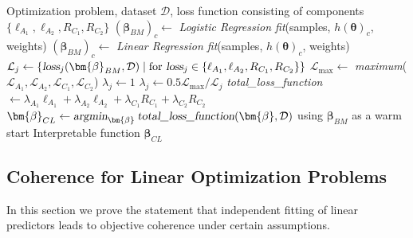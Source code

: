 \documentclass{article}
\theoremstyle{plain}
\theoremstyle{definition}
\theoremstyle{remark}
\begin{document}
\begin{algorithm}[H]
   \caption{CLEMO - Finding surrogate model}
   \label{alg:CLEMO_surr}
\begin{algorithmic}
    Optimization problem, dataset $\mathcal{D}$, loss function consisting of components $\{\ell_{A_1},\ell_{A_2},R_{C_1},R_{C_2}\}$
    \STATE $(\bm{\beta}_{BM})_c\leftarrow$ \textsl{Logistic Regression fit}(samples, $h(\bm{\theta})_c$, weights)
    \ELSE
    \STATE $(\bm{\beta}_{BM})_c\leftarrow$ \textsl{Linear Regression fit}(samples, $h(\bm{\theta})_c$, weights)
    \ENDIF
   \ENDFOR
   \STATE $\mathcal{L}_j \leftarrow \{\textsl{loss}_j(\bm{\beta}_{BM}, \mathcal{D}) \mid \text{for }\textsl{loss}_j\in \{\ell_{A_1},\ell_{A_2},R_{C_1},R_{C_2}\}\}$
   \STATE $\mathcal{L}_{\max}\leftarrow$ \textsl{maximum}($\mathcal{L}_{A_1},\mathcal{L}_{A_2},\mathcal{L}_{C_1},\mathcal{L}_{C_2}$)
   \STATE $\lambda_j\leftarrow 1$
   \ELSE
   \STATE $\lambda_j\leftarrow 0.5\mathcal{L}_{\max}/\mathcal{L}_j$
   \ENDIF
   \ENDFOR
   \STATE \textsl{total\_loss\_function} $\leftarrow \lambda_{A_1}\ell_{A_1} + \lambda_{A_2}\ell_{A_2}+ \lambda_{C_1}R_{C_1} +  \lambda_{C_2}R_{C_2}$
\STATE $\bm{\beta}_{CL}\leftarrow \textsl{argmin}_{\bm{\beta}}\:\textsl{total\_loss\_function}(\bm{\beta}, \mathcal{D})$ using $\bm{\beta}_{BM}$ as a warm start
    Interpretable function $\bm{\beta}_{CL}$
\end{algorithmic}
\end{algorithm}

\subsection{Coherence for Linear Optimization Problems}
\label{sec:app3}

In this section we prove the statement that independent fitting of linear predictors leads to objective coherence under certain assumptions. 
\end{document}
